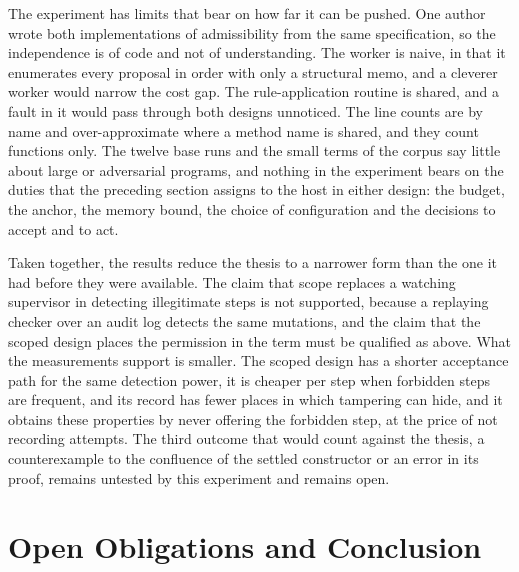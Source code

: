 \documentclass[11pt]{article}
\theoremstyle{definition}
\theoremstyle{remark}
\begin{document}
The experiment has limits that bear on how far it can be pushed. One author wrote both implementations of admissibility from the same specification, so the independence is of code and not of understanding. The worker is naive, in that it enumerates every proposal in order with only a structural memo, and a cleverer worker would narrow the cost gap. The rule-application routine is shared, and a fault in it would pass through both designs unnoticed. The line counts are by name and over-approximate where a method name is shared, and they count functions only. The twelve base runs and the small terms of the corpus say little about large or adversarial programs, and nothing in the experiment bears on the duties that the preceding section assigns to the host in either design: the budget, the anchor, the memory bound, the choice of configuration and the decisions to accept and to act.

Taken together, the results reduce the thesis to a narrower form than the one it had before they were available. The claim that scope replaces a watching supervisor in detecting illegitimate steps is not supported, because a replaying checker over an audit log detects the same mutations, and the claim that the scoped design places the permission in the term must be qualified as above. What the measurements support is smaller. The scoped design has a shorter acceptance path for the same detection power, it is cheaper per step when forbidden steps are frequent, and its record has fewer places in which tampering can hide, and it obtains these properties by never offering the forbidden step, at the price of not recording attempts. The third outcome that would count against the thesis, a counterexample to the confluence of the settled constructor or an error in its proof, remains untested by this experiment and remains open.

\section{Open Obligations and Conclusion}\label{sec:open}
\end{document}
